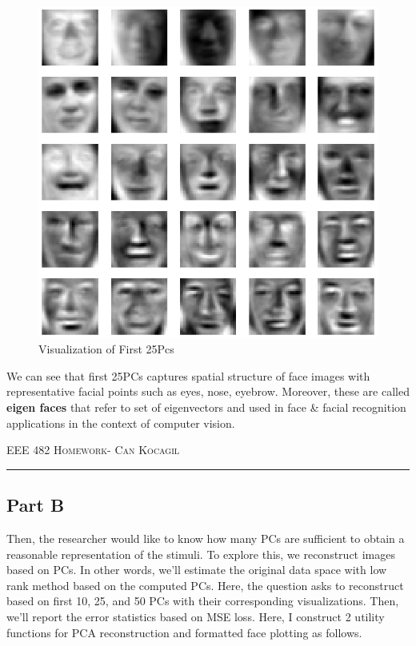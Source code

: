 \documentclass[12pt]{amsart}
\begin{document}
\begin{figure}[h]
    \centering
        \includegraphics[width = 1\textwidth]{images/Q1/PCA_components_100.png}
        \caption{Visualization of First 25Pcs}
\end{figure}

We can see that first 25PCs captures spatial structure of face images with representative facial points such as eyes, nose, eyebrow. Moreover, these are called \textbf{eigen faces} that refer to set of eigenvectors and used in face \& facial recognition applications in the context of computer vision.


\newpage
{\scshape EEE 482} \hfill {\scshape \large  Homework-\relax} \hfill {\scshape Can Kocagil}
\smallskip
\hrule
\vspace{2mm}

\subsection{Part B}
Then, the researcher would like to know how many PCs are sufficient to obtain a reasonable representation of the stimuli. To explore this, we reconstruct images based on PCs. In other words, we'll estimate the original data space with low rank method based on the computed PCs. Here, the question asks to reconstruct based on first 10, 25, and 50 PCs with their corresponding visualizations. Then, we'll report the error statistics based on MSE loss. Here, I construct 2 utility functions for PCA reconstruction and formatted face plotting as follows.
\end{document}
